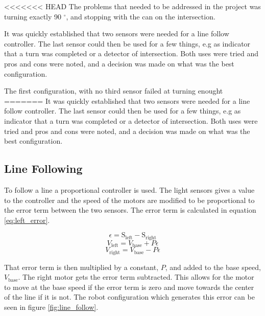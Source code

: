 <<<<<<< HEAD
The problems that needed to be addressed in the project was turning exactly 90 $^{\circ}$, and stopping with the can on the intersection.

It was quickly established that two sensors were needed for a line follow controller. The last sensor could then be used for a few things, e.g as indicator that a turn was completed or a detector of intersection. Both uses were tried and pros and cons were noted, and a decision was made on what was the best configuration.


The first configuration, with no third sensor failed at turning enought	
=======
It was quickly established that two sensors were needed for a line follow controller. The last sensor could then be used for a few things, e.g as indicator that a turn was completed or a detector of intersection. Both uses were tried and pros and cons were noted, and a decision was made on what was the best configuration. 

\subsection{Line Following}
To follow a line a proportional controller is used.
The light sensors gives a value to the controller and the speed of the motors are modified to be proportional to the error term between the two sensors.
The error term is calculated in equation \ref{eq:left_error}.

\begin{equation}
  \epsilon = \text{S}_{\text{left}} - \text{S}_{\text{right}}
 \label{eq:left_error}
\end{equation}
\begin{equation}
  V_\text{left} = V_\text{base} + P \epsilon
 \label{eq:left_speed}
\end{equation}
\begin{equation}
  V_\text{right} = V_\text{base} - P \epsilon
 \label{eq:right_speed}
\end{equation}

That error term is then multiplied by a constant, $P$, and added to the base speed, $V_\text{base}$.
The right motor gets the error term subtracted.
This allows for the motor to move at the base speed if the error term is zero and move towards the center of the line if it is not.
The robot configuration which generates this error can be seen in figure \ref{fig:line_follow}.

